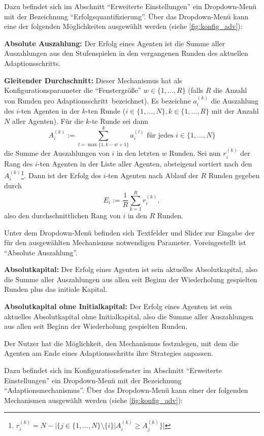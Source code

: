 \documentclass[parskip=full,11pt]{scrartcl}
\def\adapt{Adaptionsschritt}
\begin{document}
Dazu befindet sich im Abschnitt \enquote{Erweiterte Einstellungen} ein Dropdown-Menü mit der Bezeichnung \enquote{Erfolgsquantifizierung}. Über das Dropdown-Menü kann eine der folgenden Möglichkeiten ausgewählt werden (siehe \cref{fig:konfig_adv}):

\textbf{Absolute Auszahlung:}
Der \Gls{Erfolg} eines Agenten ist die Summe aller Auszahlungen aus den \Gls{Stufenspiel}en in den vergangenen Runden des aktuellen \adapt s.

\textbf{Gleitender Durchschnitt:}
Dieser Mechanismus hat als Konfigurationsparameter die \enquote{Fenstergröße} \(w \in \{1,...,R\}\) (falls \(R\) die Anzahl von Runden pro \adapt\ bezeichnet). Es bezeichne \(a_i^{(k)}\) die Auszahlung des \(i\)-ten Agenten in der \(k\)-ten Runde (\(i \in \{1,...,N\}, k \in \{1,...,R\}\) mit der Anzahl \(N\) aller Agenten). Für die \(k\)-te Runde sei dann
\[
A_i^{(k)} := \sum_{l = \max\{1,k-w+1\}}^k a_i^{(l)} \text{  für jedes  } i \in \{1,...,N\}
\]
die Summe der Auszahlungen von \(i\) in den letzten \(w\) Runden. Sei nun \(r_i^{(k)}\) der Rang des \(i\)-ten Agenten in der Liste aller Agenten, absteigend sortiert nach den \(A_i^{(k)}\)\footnote{\(r_i^{(k)} = N - |\{j \in \{1,...,N\} \setminus \{i\} | A_i^{(k)} \geq A_j^{(k)}\}|\)}. Dann ist der \Gls{Erfolg} des \(i\)-ten Agenten nach Ablauf der \(R\) Runden gegeben durch
\[
E_i := \frac 1R \sum_{k=1}^R r_i^{(k)},
\]
also den durchschnittlichen Rang von \(i\) in den \(R\) Runden.

Unter dem Dropdown-Menü befinden sich Textfelder und Slider zur Eingabe der für den ausgewählten Mechanismus notwendigen Parameter. Voreingestellt ist \enquote{Absolute Auszahlung}.

\textbf{Absolutkapital:}
Der \Gls{Erfolg} eines Agenten ist sein aktuelles Absolutkapital, also die Summe aller Auszahlungen aus allen seit Beginn der Wiederholung gespielten Runden plus das initiale \Gls{Kapital}.

\textbf{Absolutkapital ohne Initialkapital:}
Der \Gls{Erfolg} eines Agenten ist sein aktuelles Absolutkapital ohne Initialkapital, also die Summe aller Auszahlungen aus allen seit Beginn der Wiederholung gespielten Runden.

Der \Gls{Nutzer} hat die Möglichkeit, den Mechanismus festzulegen, mit dem die Agenten am Ende eines \adapt s ihre \Glspl{Strategie} anpassen.

Dazu befindet sich im Konfigurationsfenster im Abschnitt \enquote{Erweiterte Einstellungen} ein Dropdown-Menü mit der Bezeichnung \enquote{Adaptionsmechanismus}. Über das Dropdown-Menü kann einer der folgenden Mechanismen ausgewählt werden (siehe \cref{fig:konfig_adv}):
\end{document}
